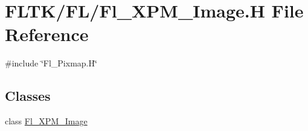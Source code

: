 \hypertarget{_fl___x_p_m___image_8_h}{}\section{F\+L\+T\+K/\+F\+L/\+Fl\+\_\+\+X\+P\+M\+\_\+\+Image.H File Reference}
\label{_fl___x_p_m___image_8_h}
{\ttfamily \#include \char`\"{}Fl\+\_\+\+Pixmap.\+H\char`\"{}}\newline
\subsection*{Classes}
\begin{DoxyCompactItemize}
\item 
class \hyperlink{class_fl___x_p_m___image}{Fl\+\_\+\+X\+P\+M\+\_\+\+Image}
\end{DoxyCompactItemize}
